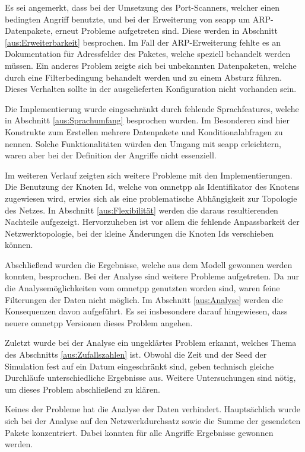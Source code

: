 Es sei angemerkt, dass bei der Umsetzung des Port-Scanners, welcher einen bedingten Angriff benutzte, und bei der Erweiterung von \gls{seapp} um ARP-Datenpakete, erneut Probleme aufgetreten sind. Diese werden in Abschnitt \ref{aus:Erweiterbarkeit} besprochen. Im Fall der ARP-Erweiterung fehlte es an Dokumentation für Adressfelder des Paketes, welche speziell behandelt werden müssen. Ein anderes Problem zeigte sich bei unbekannten Datenpaketen, welche durch eine Filterbedingung behandelt werden und zu einem Absturz führen. Dieses Verhalten sollte in der ausgelieferten Konfiguration nicht vorhanden sein.

Die Implementierung wurde eingeschränkt durch fehlende Sprachfeatures, welche in Abschnitt \ref{aus:Sprachumfang} besprochen wurden. Im Besonderen sind hier Konstrukte zum Erstellen mehrere Datenpakete und Konditionalabfragen zu nennen. Solche Funktionalitäten würden den Umgang mit \gls{seapp} erleichtern, waren aber bei der Definition der Angriffe nicht essenziell.

Im weiteren Verlauf zeigten sich weitere Probleme mit den Implementierungen. Die Benutzung der Knoten Id, welche von \gls{omnetpp} als Identifikator des Knotens zugewiesen wird, erwies sich als eine problematische Abhängigkeit zur Topologie des Netzes. In Abschnitt \ref{aus:Flexibilität} werden die daraus resultierenden Nachteile aufgezeigt. Hervorzuheben ist vor allem die fehlende Anpassbarkeit der Netzwerktopologie, bei der kleine Änderungen die Knoten Ids verschieben können. 

Abschließend wurden die Ergebnisse, welche aus dem Modell gewonnen werden konnten, besprochen. Bei der Analyse sind weitere Probleme aufgetreten. Da nur die Analysemöglichkeiten vom \gls{omnetpp} genutzten worden sind, waren feine Filterungen der Daten nicht möglich. Im Abschnitt \ref{aus:Analyse} werden die Konsequenzen davon aufgeführt. Es sei insbesondere darauf hingewiesen, dass neuere \gls{omnetpp} Versionen dieses Problem angehen.

Zuletzt wurde bei der Analyse ein ungeklärtes Problem erkannt, welches Thema des Abschnitts \ref{aus:Zufallszahlen} ist. Obwohl die Zeit und der Seed der Simulation fest auf ein Datum eingeschränkt sind, geben technisch gleiche Durchläufe unterschiedliche Ergebnisse aus. Weitere Untersuchungen sind nötig, um dieses Problem abschließend zu klären.

Keines der Probleme hat die Analyse der Daten verhindert. Hauptsächlich wurde sich bei der Analyse auf den Netzwerkdurchsatz sowie die Summe der gesendeten Pakete konzentriert. Dabei konnten für alle Angriffe Ergebnisse gewonnen werden.

